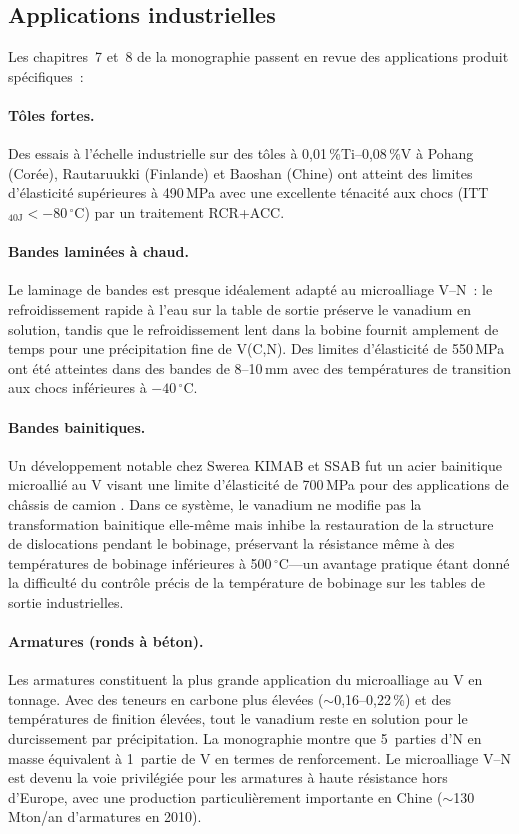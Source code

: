 \documentclass[11pt,a4paper]{article}
\begin{document}
\subsection{Applications industrielles}

Les chapitres~7 et~8 de la monographie passent en revue des applications
produit sp\'ecifiques~:

\paragraph{T\^oles fortes.}  Des essais \`a l'\'echelle industrielle sur
des t\^oles \`a 0,01\,\%Ti--0,08\,\%V \`a Pohang (Cor\'ee),
Rautaruukki (Finlande) et Baoshan (Chine) ont atteint des limites
d'\'elasticit\'e sup\'erieures \`a 490\,MPa avec une excellente
t\'enacit\'e aux chocs (ITT$_{40\text{J}} < -80\,{}^\circ$C) par un
traitement RCR+ACC.

\paragraph{Bandes lamin\'ees \`a chaud.}  Le laminage de bandes est
presque id\'ealement adapt\'e au microalliage V--N~: le refroidissement
rapide \`a l'eau sur la table de sortie pr\'eserve le vanadium en
solution, tandis que le refroidissement lent dans la bobine fournit
amplement de temps pour une pr\'ecipitation fine de V(C,N).  Des limites
d'\'elasticit\'e de 550\,MPa ont \'et\'e atteintes dans des bandes de
8--10\,mm avec des temp\'eratures de transition aux chocs inf\'erieures
\`a $-40\,{}^\circ$C.

\paragraph{Bandes bainitiques.}  Un d\'eveloppement notable chez Swerea
KIMAB et SSAB fut un acier bainitique microalli\'e au V visant une
limite d'\'elasticit\'e de 700\,MPa pour des applications de ch\^assis
de camion \cite{Hutchinson2014Bainite}.  Dans ce syst\`eme, le vanadium
ne modifie pas la transformation bainitique elle-m\^eme mais inhibe la
restauration de la structure de dislocations pendant le bobinage,
pr\'eservant la r\'esistance m\^eme \`a des temp\'eratures de bobinage
inf\'erieures \`a 500\,${}^\circ$C---un avantage pratique \'etant donn\'e
la difficult\'e du contr\^ole pr\'ecis de la temp\'erature de bobinage
sur les tables de sortie industrielles.

\paragraph{Armatures (ronds \`a b\'eton).}  Les armatures constituent la
plus grande application du microalliage au V en tonnage.  Avec des
teneurs en carbone plus \'elev\'ees ($\sim$0,16--0,22\,\%) et des
temp\'eratures de finition \'elev\'ees, tout le vanadium reste en
solution pour le durcissement par pr\'ecipitation.  La monographie
montre que 5~parties d'N en masse \'equivalent \`a 1~partie de V en
termes de renforcement.  Le microalliage V--N est devenu la voie
privil\'egi\'ee pour les armatures \`a haute r\'esistance hors d'Europe,
avec une production particuli\`erement importante en Chine
($\sim$130\,Mton/an d'armatures en 2010).
\end{document}
